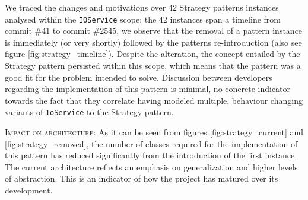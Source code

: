 We traced the changes and motivations over 42 Strategy patterns instances analysed within the \texttt{IOService} scope; the 42 instances span a timeline from commit \#41 to commit \#2545, we observe that the removal of a pattern instance is immediately (or very shortly) followed by the patterns re-introduction (also see figure \ref{fig:strategy_timeline}). Despite the alteration, the concept entailed by the Strategy pattern persisted within this scope, which means that the pattern was a good fit for the problem intended to solve. Discussion between developers regarding the implementation of this pattern is minimal, no concrete indicator towards the fact that they correlate having modeled multiple, behaviour changing variants of \texttt{IoService} to the Strategy pattern.

\textsc{Impact on architecture}: As it can be seen from figures \ref{fig:strategy_current} and \ref{fig:strategy_removed}, the number of classes required for the implementation of this pattern has reduced significantly from the introduction of the first instance. The current architecture reflects an emphasis on generalization and higher levels of abstraction. This is an indicator of how the project has matured over its development.

